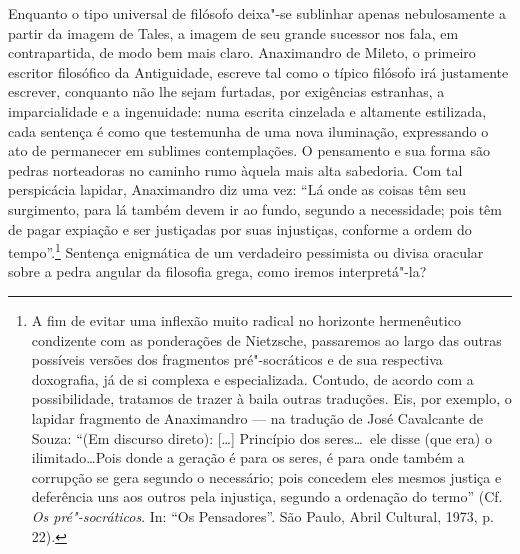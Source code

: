 Enquanto o tipo universal de filósofo deixa"-se sublinhar apenas nebulosamente
a partir da imagem de Tales, a imagem de seu grande sucessor nos fala, em
contrapartida, de modo bem mais claro. Anaximandro de Mileto, o primeiro
escritor filosófico da \label{primeiroescritor} Antiguidade, escreve tal
como o típico filósofo irá justamente escrever, conquanto não lhe sejam
furtadas, por exigências estranhas, a imparcialidade e a ingenuidade: numa
escrita cinzelada e altamente estilizada, cada sentença é como que testemunha
de uma nova iluminação, expressando o ato de permanecer em sublimes
contemplações. O pensamento e sua forma são pedras norteadoras no caminho
rumo àquela mais alta sabedoria. Com tal perspicácia lapidar, Anaximandro diz
uma vez: ``Lá \label{laondeascoisas} onde as coisas têm seu surgimento,
para lá também devem ir ao fundo, segundo a necessidade; pois têm de pagar
expiação e ser justiçadas por suas injustiças, conforme a ordem do
tempo''.\footnote{A fim de evitar uma inflexão muito radical no horizonte
hermenêutico condizente com as ponderações de Nietzsche, passaremos ao largo
das outras possíveis versões dos fragmentos pré"-socráticos e de sua
respectiva doxografia, já de si complexa e especializada. Contudo, de acordo
com a possibilidade, tratamos de trazer à baila outras traduções. Eis, por
exemplo, o lapidar fragmento de Anaximandro --- na tradução de José Cavalcante
de Souza: ``(Em discurso direto): [\ldots] Princípio dos seres\ldots\ ele
disse (que era) o ilimitado\ldots Pois donde a geração é para os seres, é
para onde também a corrupção se gera segundo o necessário; pois concedem eles
mesmos justiça e deferência uns aos outros pela injustiça, segundo a
ordenação do termo'' (Cf.\,\textit{Os pré"-socráticos}. In: ``Os Pensadores''.
São Paulo, Abril Cultural, 1973, p.\,22).} Sentença enigmática de um
verdadeiro pessimista ou divisa oracular sobre a pedra angular da filosofia
grega, como iremos interpretá"-la?

